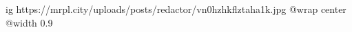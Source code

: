  
 
 
 
 

\ifcmt
  ig https://mrpl.city/uploads/posts/redactor/vn0hzhkflztaha1k.jpg
  @wrap center
  @width 0.9
\fi
